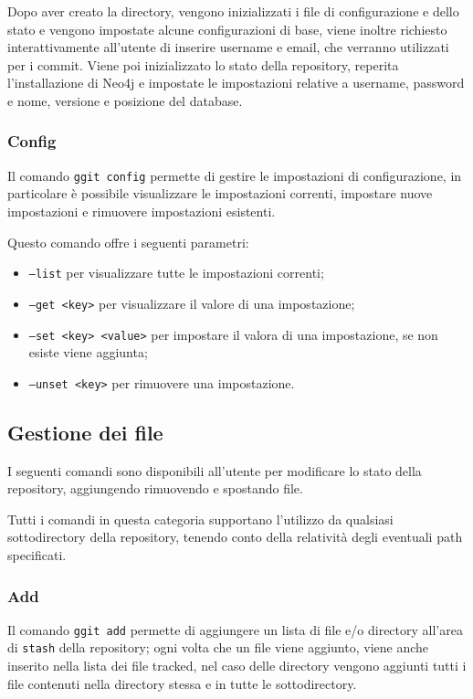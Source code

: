 Dopo aver creato la directory, vengono inizializzati i file di configurazione e dello stato e vengono impostate alcune configurazioni di base, viene inoltre richiesto interattivamente all'utente di inserire username e email, che verranno utilizzati per i commit.
Viene poi inizializzato lo stato della repository, reperita l'installazione di Neo4j e impostate le impostazioni relative a username, password e nome, versione e posizione del database.

\subsubsection{Config}
Il comando \texttt{ggit config} permette di gestire le impostazioni di configurazione, in particolare è possibile visualizzare le impostazioni correnti, impostare nuove impostazioni e rimuovere impostazioni esistenti.

Questo comando offre i seguenti parametri:
\begin{itemize}
    \item \texttt{--list} per visualizzare tutte le impostazioni correnti;
    \item \texttt{--get <key>} per visualizzare il valore di una impostazione;
    \item \texttt{--set <key> <value>} per impostare il valora di una impostazione, se non esiste viene aggiunta;
    \item \texttt{--unset <key>} per rimuovere una impostazione.
\end{itemize}

\subsection{Gestione dei file}
I seguenti comandi sono disponibili all'utente per modificare lo stato della repository, aggiungendo rimuovendo e spostando file.

Tutti i comandi in questa categoria supportano l'utilizzo da qualsiasi sottodirectory della repository, tenendo conto della relatività degli eventuali path specificati.
\subsubsection{Add}
Il comando \texttt{ggit add} permette di aggiungere un lista di file e/o directory all'area di \texttt{stash} della repository; ogni volta che un file viene aggiunto, viene anche inserito nella lista dei file tracked, nel caso delle directory vengono aggiunti tutti i file contenuti nella directory stessa e in tutte le sottodirectory.

